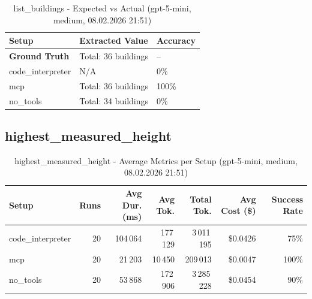 \documentclass[a4paper,11pt]{article}
\begin{document}
\begin{table}[H]
\centering
\scriptsize
\caption{list\_buildings - Expected vs Actual (gpt-5-mini, medium, 08.02.2026 21:51)}
\begin{tabular}{l l l}
\toprule
Setup & Extracted Value & Accuracy \\
\midrule
\textbf{Ground Truth} & Total: 36 buildings & -- \\
\midrule
code\_interpreter & N/A & 0\% \\
mcp & Total: 36 buildings & 100\% \\
no\_tools & Total: 34 buildings & 0\% \\
\bottomrule
\end{tabular}
\end{table}

\clearpage

\subsection{highest\_measured\_height}

\begin{table}[H]
\centering
\scriptsize
\caption{highest\_measured\_height - Average Metrics per Setup (gpt-5-mini, medium, 08.02.2026 21:51)}
\label{tab:combined\_highest\_measured\_height\_metrics\_20260208}
\begin{tabular}{l r r r r r r}
\toprule
Setup & Runs & Avg Dur. (ms) & Avg Tok. & Total Tok. & Avg Cost (\$) & Success Rate \\
\midrule
code\_interpreter & 20 & 104\,064 & 177\,129 & 3\,011\,195 & \$0.0426 & 75\% \\
mcp & 20 & 21\,203 & 10\,450 & 209\,013 & \$0.0047 & 100\% \\
no\_tools & 20 & 53\,868 & 172\,906 & 3\,285\,228 & \$0.0454 & 90\% \\
\bottomrule
\end{tabular}
\end{table}
\end{document}
